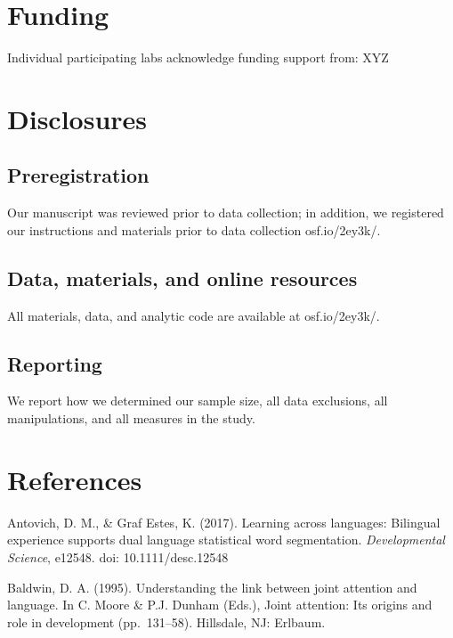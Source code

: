 \documentclass[,man,floatsintext]{apa6}
\begin{document}
\hypertarget{funding}{%
\section{Funding}\label{funding}}

Individual participating labs acknowledge funding support from: XYZ

\hypertarget{disclosures}{%
\section{Disclosures}\label{disclosures}}

\hypertarget{preregistration}{%
\subsection{Preregistration}\label{preregistration}}

Our manuscript was reviewed prior to data collection; in addition, we registered our instructions and materials prior to data collection osf.io/2ey3k/.

\hypertarget{data-materials-and-online-resources}{%
\subsection{Data, materials, and online resources}\label{data-materials-and-online-resources}}

All materials, data, and analytic code are available at osf.io/2ey3k/.

\hypertarget{reporting}{%
\subsection{Reporting}\label{reporting}}

We report how we determined our sample size, all data exclusions, all manipulations, and all measures in the study.

\newpage

\hypertarget{references}{%
\section{References}\label{references}}

Antovich, D. M., \& Graf Estes, K. (2017). Learning across languages: Bilingual experience supports dual language statistical word segmentation. \emph{Developmental Science}, e12548. doi: 10.1111/desc.12548

Baldwin, D. A. (1995). Understanding the link between joint attention and language. In C. Moore \& P.J. Dunham (Eds.), Joint attention: Its origins and role in development (pp.~131--58). Hillsdale, NJ: Erlbaum.
\end{document}
